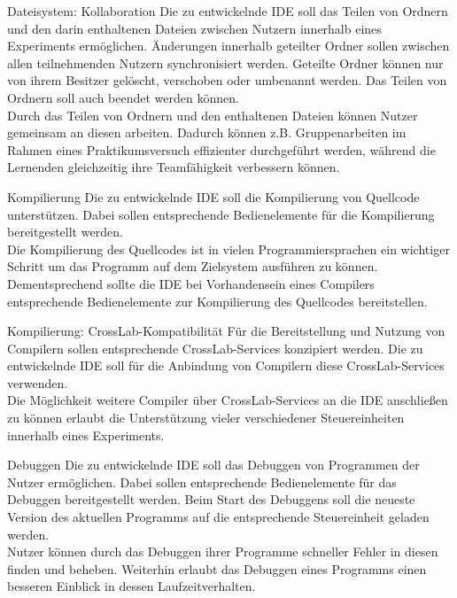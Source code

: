 \begin{requirement}{Dateisystem: Kollaboration}
    \reqdescription Die zu entwickelnde IDE soll das Teilen von Ordnern und den darin enthaltenen Dateien zwischen Nutzern innerhalb eines Experiments ermöglichen. Änderungen innerhalb geteilter Ordner sollen zwischen allen teilnehmenden Nutzern synchronisiert werden. Geteilte Ordner können nur von ihrem Besitzer gelöscht, verschoben oder umbenannt werden. Das Teilen von Ordnern soll auch beendet werden können. \\
    \reqrationale Durch das Teilen von Ordnern und den enthaltenen Dateien können Nutzer gemeinsam an diesen arbeiten. Dadurch können z.B. Gruppenarbeiten im Rahmen eines Praktikumsversuch effizienter durchgeführt werden, während die Lernenden gleichzeitig ihre Teamfähigkeit verbessern können. \\
\end{requirement}

\begin{requirement}{Kompilierung}
    \reqdescription Die zu entwickelnde IDE soll die Kompilierung von Quellcode unterstützen. Dabei sollen entsprechende Bedienelemente für die Kompilierung bereitgestellt werden.  \\
    \reqrationale Die Kompilierung des Quellcodes ist in vielen Programmiersprachen ein wichtiger Schritt um das Programm auf dem Zielsystem ausführen zu können. Dementsprechend sollte die IDE bei Vorhandensein eines Compilers entsprechende Bedienelemente zur Kompilierung des Quellcodes bereitstellen. \\
\end{requirement}

\begin{requirement}{Kompilierung: CrossLab-Kompatibilität}
    \reqdescription Für die Bereitstellung und Nutzung von Compilern sollen entsprechende CrossLab-Services konzipiert werden. Die zu entwickelnde IDE soll für die Anbindung von Compilern diese CrossLab-Services verwenden. \\
    \reqrationale Die Möglichkeit weitere Compiler über CrossLab-Services an die IDE anschließen zu können erlaubt die Unterstützung vieler verschiedener Steuereinheiten innerhalb eines Experiments. \\
\end{requirement}

\begin{requirement}{Debuggen}
    \reqdescription Die zu entwickelnde IDE soll das Debuggen von Programmen der Nutzer ermöglichen. Dabei sollen entsprechende Bedienelemente für das Debuggen bereitgestellt werden. Beim Start des Debuggens soll die neueste Version des aktuellen Programms auf die entsprechende Steuereinheit geladen werden. \\
    \reqrationale Nutzer können durch das Debuggen ihrer Programme schneller Fehler in diesen finden und beheben. Weiterhin erlaubt das Debuggen eines Programms einen besseren Einblick in dessen Laufzeitverhalten. \\
\end{requirement}


